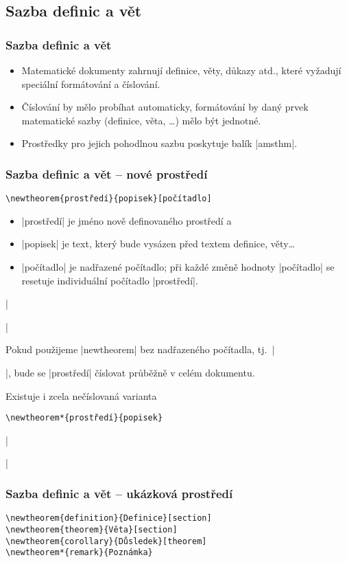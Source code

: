 \subsection{Sazba definic a vět}
\begin{frame}[fragile]
	\frametitle{Sazba definic a vět}
	\begin{itemize}
		\item Matematické dokumenty zahrnují definice, věty, důkazy atd., které vyžadují speciální formátování a číslování.
		\item Číslování by mělo probíhat automaticky, formátování by daný prvek matematické sazby (definice, věta, \ldots) mělo být jednotné.
		\item Prostředky pro jejich pohodlnou sazbu poskytuje balík |amsthm|.
	\end{itemize}
\end{frame}


\begin{frame}
	\frametitle{Sazba definic a vět -- nové prostředí}
	\begin{BVerbatim}
\newtheorem{prostředí}{popisek}[počítadlo]
	\end{BVerbatim}
	\begin{itemize}
		\item |prostředí| je jméno nově definovaného prostředí a
		\item |popisek| je text, který bude vysázen před textem definice, věty\ldots
		\item |počítadlo| je nadřazené počítadlo; při každé změně hodnoty |počítadlo| se resetuje individuální počítadlo |prostředí|.
	\end{itemize}
	\begin{example}
		|\newtheorem{theorem}{Věta}[section]|
	\end{example}
	\framebreak
	Pokud použijeme |newtheorem| bez nadřazeného počítadla, tj.\ |\newtheorem{prostředí}{popisek}|, bude se |prostředí| číslovat průběžně v celém dokumentu.\par
	Existuje i zcela nečíslovaná varianta 
	\begin{BVerbatim}
\newtheorem*{prostředí}{popisek}
	\end{BVerbatim}
	\begin{example}
		|\newtheorem*{remark}{Remark}|
	\end{example}
\end{frame}


\begin{frame}
	\frametitle{Sazba definic a vět -- ukázková prostředí}
	\begin{BVerbatim}
\newtheorem{definition}{Definice}[section]
\newtheorem{theorem}{Věta}[section]
\newtheorem{corollary}{Důsledek}[theorem]
\newtheorem*{remark}{Poznámka}
	\end{BVerbatim}
\end{frame}


